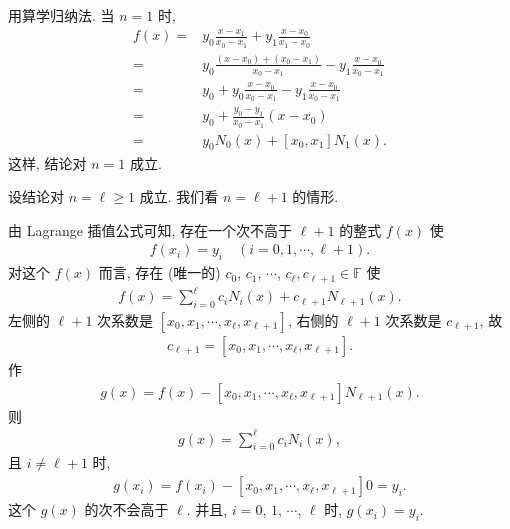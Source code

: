 \begin{pf}
    用算学归纳法. 当 $n=1$ 时,
    \begin{align*}
        f(x)
        = {} & y_0 \frac{x - x_1}{x_0 - x_1}
        + y_1 \frac{x - x_0}{x_1 - x_0}                      \\
        = {} & y_0 \frac{(x - x_0) + (x_0 - x_1)}{x_0 - x_1}
        - y_1 \frac{x - x_0}{x_0 - x_1}                      \\
        = {} & y_0 + y_0 \frac{x - x_0}{x_0 - x_1}
        - y_1 \frac{x - x_0}{x_0 - x_1}                      \\
        = {} & y_0 + \frac{y_0 - y_1}{x_0 - x_1} (x - x_0)   \\
        = {} & y_0 N_0 (x) + [x_0, x_1] N_1 (x).
    \end{align*}
    这样, 结论对 $n=1$ 成立.

    设结论对 $n = \ell \geq 1$ 成立. 我们看 $n = \ell + 1$ 的情形.

    由 Lagrange 插值公式可知, 存在一个次不高于 $\ell + 1$ 的整式 $f(x)$ 使
    \begin{align*}
        f(x_i) = y_i \quad (i = 0,1,\cdots,\ell + 1).
    \end{align*}
    对这个 $f(x)$ 而言, 存在 (唯一的) $c_0$, $c_1$, $\cdots$, $c_{\ell}, c_{\ell + 1} \in \mathbb{F}$ 使
    \begin{align*}
        f(x) = \sum_{i = 0}^{\ell} c_i N_{i} (x) + c_{\ell + 1} N_{\ell + 1} (x).
    \end{align*}
    左侧的 $\ell + 1$ 次系数是 $[x_0, x_1, \cdots, x_\ell, x_{\ell + 1}]$, 右侧的 $\ell + 1$ 次系数是 $c_{\ell + 1}$, 故
    \begin{align*}
        c_{\ell + 1} = [x_0, x_1, \cdots, x_\ell, x_{\ell + 1}].
    \end{align*}
    作
    \begin{align*}
        g(x) = f(x) - [x_0, x_1, \cdots, x_\ell, x_{\ell + 1}] N_{\ell + 1} (x).
    \end{align*}
    则
    \begin{align*}
        g(x) = \sum_{i = 0}^{\ell} c_i N_{i} (x),
    \end{align*}
    且 $i \neq \ell + 1$ 时,
    \begin{align*}
        g(x_i) = f(x_i) - [x_0, x_1, \cdots, x_\ell, x_{\ell + 1}] 0 = y_i.
    \end{align*}
    这个 $g(x)$ 的次不会高于 $\ell$. 并且, $i = 0$, $1$, $\cdots$, $\ell$ 时, $g(x_i) = y_i$.


\end{pf}
